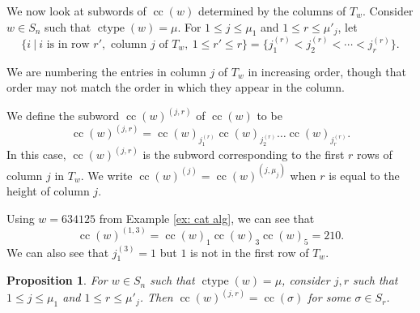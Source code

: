 \documentclass[10pt]{amsart}
\theoremstyle{plain}
\theoremstyle{definition}
\theoremstyle{plain}
\theoremstyle{plain}
\newtheorem{prop}[prop]{Proposition}
\theoremstyle{remark}
\theoremstyle{plain}
\theoremstyle{plain}
\DeclareMathOperator{\ctype}{ctype}
\DeclareMathOperator{\cc}{cc}
\begin{document}
We now look at subwords of $\cc(w)$ determined by the columns of $T_w$. Consider $w\in S_n$ such that $\ctype(w) = \mu$.
For $1\leq j \leq \mu_1$ and $1\leq r \leq \mu'_j$, let \[\{i \ | \ i \text{ is in row } r', \text{ column } j \text{ of } T_w, \ 1\leq r' \leq r\} = \{j^{(r)}_1 < j^{(r)}_2 < \cdots < j^{(r)}_r\}.\]

We are numbering the entries in column $j$ of $T_w$ in increasing order, though that order may not match the order in which they appear in the column. 

We define the subword $\cc(w)^{(j,r)}$ of $\cc(w)$ to be \[\cc(w)^{(j,r)} = \cc(w)_{j^{(r)}_1}\cc(w)_{j^{(r)}_2}\dots \cc(w)_{j^{(r)}_r}.\]
In this case, $\cc(w)^{(j,r)}$ is the subword corresponding to the first $r$ rows of column $j$ in $T_w$. We write $\cc(w)^{(j)} = \cc(w)^{(j,\mu_j)}$ when $r$ is equal to the height of column $j$.


\begin{ex}
   Using $w=  634125 $ from Example \ref{ex: cat alg}, we can see that \[\cc(w)^{(1,3)} = \cc(w)_1\cc(w)_3\cc(w)_5 = 210.\]
We can also see that $j^{(3)}_1 = 1$ but $1$ is not in the first row of $T_w$. 
\end{ex}


\begin{prop}\label{prop: subword of column is a cocharge word}
For $w\in S_n$ such that $\ctype(w) = \mu$, consider $j,r$ such that $1\leq j \leq \mu_1$ and $1\leq r \leq \mu'_j$.
Then $\cc(w)^{(j,r)} = \cc(\sigma)$ for some $\sigma \in S_r$.
\end{prop}
\end{document}
